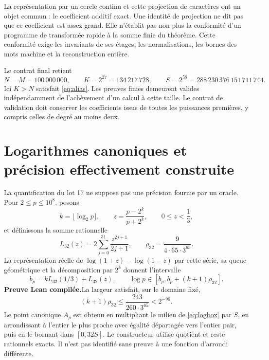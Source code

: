 \documentclass[11pt,a4paper]{article}
\theoremstyle{remark}
\newcommand{\paid}{\textbf{Preuve Lean compilée.}\space}
\begin{document}
La représentation par un cercle continu et cette projection de caractères
ont un objet commun : le coefficient additif exact. Une identité de
projection ne dit pas que ce coefficient est assez grand. Elle n'établit
pas non plus la conformité d'un programme de transformée rapide à la somme
finie du théorème. Cette conformité exige les invariants de ses étages, les
normalisations, les bornes des mots machine et la reconstruction entière.

Le contrat final retient
\begin{equation}\label{eq:fixed}
N=M=100\,000\,000,\qquad K=2^{27}=134\,217\,728,
\qquad S=2^{58}=288\,230\,376\,151\,711\,744.
\end{equation}
Ici $K>N$ satisfait \eqref{eq:alias}. Les preuves finies demeurent valides
indépendamment de l'achèvement d'un calcul à cette taille. Le contrat de
validation doit conserver les coefficients issus de toutes les puissances
premières, y compris celles de degré au moins deux.

\clearpage
\section{Logarithmes canoniques et précision effectivement construite}\label{sec:quant}
La quantification du lot 17 ne suppose pas une précision fournie par un
oracle. Pour $2\le p\le10^8$, posons
\[
k=\lfloor\log_2p\rfloor,\qquad
z=\frac{p-2^k}{p+2^k},\qquad 0\le z<\frac13,
\]
et définissons la somme rationnelle
\begin{equation}\label{eq:log32}
L_{32}(z)=2\sum_{j=0}^{31}\frac{z^{2j+1}}{2j+1},\qquad
\rho_{32}=\frac{9}{4\cdot65\cdot3^{65}}.
\end{equation}
La représentation réelle de $\log(1+z)-\log(1-z)$ par cette série,
sa queue géométrique et la décomposition par $2^k$ donnent l'intervalle
\begin{equation}\label{eq:logbox}
b_p=kL_{32}(1/3)+L_{32}(z),\qquad
\log p\in[b_p,b_p+(k+1)\rho_{32}].
\end{equation}
\paid La largeur satisfait, sur le domaine fixé,
\[
(k+1)\rho_{32}\le\frac{243}{260\cdot3^{65}}<2^{-96}.
\]
Le point canonique $A_p$ est obtenu en multipliant le milieu de
\eqref{eq:logbox} par $S$, en arrondissant à l'entier le plus proche avec
égalité départagée vers l'entier pair, puis en le bornant dans $[0,32S]$.
Le constructeur utilise quotient et reste rationnels exacts. Il n'est pas
identifié sans preuve à une fonction d'arrondi différente.
\end{document}
